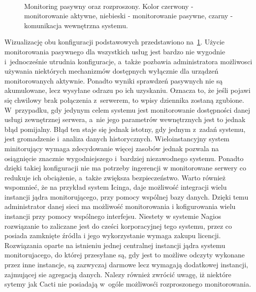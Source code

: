 \begin{figure}[h]
\label{fig:PorPasIRozp}
  \caption{Monitoring pasywny oraz rozproszony. Kolor czerwony -
    monitorowanie aktywne, niebieski - monitorowanie pasywne, czarny -
    komunikacja wewnętrzna systemu.}
\\[0.1cm]
\end{figure}

Wizualizację obu konfiguracji podstawowych przedstawiono
na~\ref{fig:PorPasIRozp}. Użycie monitorowania pasywnego dla
wszystkich usług jest bardzo nie wygodnie i~jednocześnie utrudnia
konfiguracje, a~także pozbawia administratora możliwosci używania
niektórych mechanizmów dostępnych wyłącznie dla urządzeń
monitorowanych aktywnie. Ponadto wyniki sprawdzeń pasywnych nie są
akumulowane, lecz wysyłane odrazu po ich uzyskaniu. Oznacza to, że
jeśli pojawi się chwilowy brak połączenia z~serwerem, to wpisy
dziennika zostaną zgubione. W~przypadku, gdy jedynym celem systemu
jest monitorowanie dostępności danej usługi zewnętrznej serwera, a~nie
jego parametrów wewnętrznych jest to jednak błąd pomijalny. Błąd ten
staje się jednak istotny, gdy jednym z~zadań systemu, jest gromadzenie
i~analiza danych historycznych. Wieloinstancyjny system minitorujący
wymaga zdecydowanie więcej zasobów jednak pozwala na osiągnięcie
znacznie wygodniejszego i~bardziej niezawodnego systemu. Ponadto
dzięki takiej konfiguracji nie ma potrzeby ingerencji w monitorowane
serwery co redukuje ich obciążenie, a~także zwiększa
bezpieczeństwo. Warto również wspomnieć, że na przykład system Icinga,
daje możliwość integracji wielu instancji jądra monitorującego, przy
pomocy wspólnej bazy danych. Dzięki temu administrator danej sieci ma
możliwość monitorowania i kofigurowania wielu instancji przy pomocy
wspólnego interfejsu. Niestety w systemie Nagios rozwiązanie to
zaliczane jest do cześci korporacyjnej tego systemu, przez co posiada
zamknięte źródła i jego wykorzystanie wymaga zakupu
licencji. Rozwiązania oparte na istnieniu jednej centralnej instancji
jądra systemu monitorujacego, do której przesyłane są, gdy jest to
możliwe odczyty wykonane przez inne instancje, są zazwyczaj darmowe
lecz wymagają dodatkowej instancji, zajmującej sie agregacją
danych. Nalezy również zwrócić uwagę, iż niektóre sytemy jak Cacti nie
posiadają w~ogóle możliwosći rozproszonego monitorowania.

